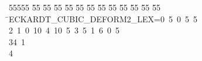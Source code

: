 %
%
\begin{tabbing}
55555 \= 55 \= 55 \= 55 \= 55 \= 55 \= 55 \= 55 \= 55 \= 55 \= 55 \= 55 \= 55 \= \>ECKARDT\_CUBIC\_DEFORM2\_LEX=0\ 5\ 0\ 5\ 5\ \\[0pt]
2\ 1\ 0\ 10\ 4\ 10\ 5\ 3\ 5\ 1\ 6\ 0\ 5\ \\[0pt]
3\>4\ 1\\[0pt]
4\>\end{tabbing}
